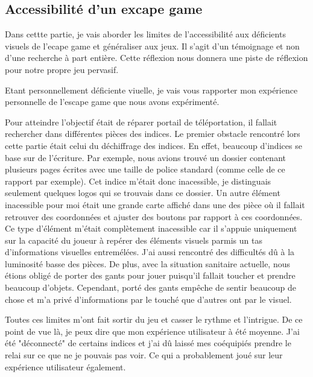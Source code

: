 \documentclass{article}
\begin{document}
	\subsection{Accessibilité d'un excape game}
		Dans cettte partie, je vais aborder les limites de l'accessibilité aux déficients visuels de l'ecape game et généraliser aux jeux. 
		Il s'agit d'un témoignage et non d'une recherche à part entière.
		Cette réflexion nous donnera une piste de réflexion pour notre propre jeu pervasif.\par
		Etant personnellement déficiente viuelle, je vais vous rapporter mon expérience personnelle de l'escape game que nous avons expérimenté.\par
		Pour atteindre l'objectif était de réparer portail de téléportation, il fallait rechercher dans différentes pièces des indices.
		Le premier obstacle rencontré lors cette partie était celui du déchiffrage des indices.
		En effet, beaucoup d'indices se base sur de l'écriture.
		Par exemple, nous avions trouvé un dossier contenant plusieurs pages écrites avec une taille de police standard (comme celle de ce rapport par exemple).
		Cet indice m'était donc inacessible, je distinguais seulement quelques logos qui se trouvais dans ce dossier.
		Un autre élément inacessible pour moi était une grande carte affiché dans une des pièce où il fallait retrouver des coordonnées et ajuster des boutons par rapport à ces coordonnées.
		Ce type d'élément m'était complètement inacessible car il s'appuie uniquement sur la capacité du joueur à repérer des éléments visuels parmis un tas d'informations visuelles entremélées.
		J'ai aussi rencontré des difficultés dû à la luminosité basse des pièces.
		De plus, avec la situation sanitaire actuelle, nous étions obligé de porter des gants pour jouer puisqu'il fallait toucher et prendre beaucoup d'objets.
		Cependant, porté des gants empêche de sentir beaucoup de chose et m'a privé d'informations par le touché que d'autres ont par le visuel.\par
		Toutes ces limites m'ont fait sortir du jeu et casser le rythme et l'intrigue.
		De ce point de vue là, je peux dire que mon expérience utilisateur à été moyenne.
		J'ai été "déconnecté" de certains indices et j'ai dû laissé mes coéquipiés prendre le relai sur ce que ne je pouvais pas voir.
		Ce qui a probablement joué sur leur expérience utilisateur également.
\end{document}
